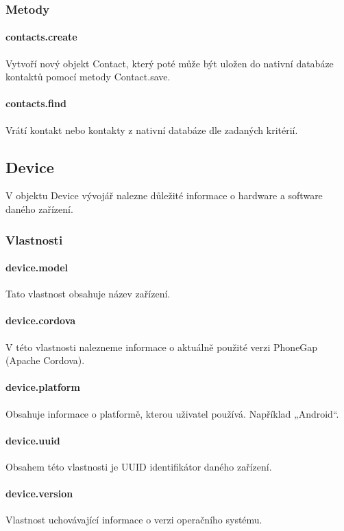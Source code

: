 \subsubsection{Metody}
\paragraph{contacts.create}
Vytvoří nový objekt Contact, který poté může být uložen do nativní databáze kontaktů pomocí metody Contact.save.

\paragraph{contacts.find}
Vrátí kontakt nebo kontakty z nativní databáze dle zadaných kritérií.

\subsection{Device}
V objektu Device vývojář nalezne důležité informace o hardware a software daného zařízení.

\subsubsection{Vlastnosti}
\paragraph{device.model}
Tato vlastnost obsahuje název zařízení.

\paragraph{device.cordova}
V této vlastnosti nalezneme informace o aktuálně použité verzi PhoneGap (Apache Cordova).

\paragraph{device.platform}
Obsahuje informace o platformě, kterou uživatel používá. Například „Android“.

\paragraph{device.uuid}
Obsahem této vlastnosti je UUID identifikátor daného zařízení.

\paragraph{device.version}
Vlastnost uchovávající informace o verzi operačního systému.

